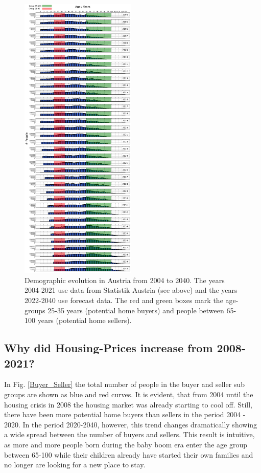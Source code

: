 \documentclass[11pt, a4paper, twocolumn]{article}
\begin{document}
\begin{figure}[!ht]
\includegraphics[width=0.49\textwidth]{../Figures/Demog_Forecast.png}
\caption{\small Demographic evolution in Austria from 2004 to 2040. The years 2004-2021 use data from Statistik Austria (see above) and the years 2022-2040 use forecast data. The red and green boxes mark the age-groups 25-35 years (potential home buyers) and people between 65-100 years (potential home sellers). \label{Demog_Forecast}}
\end{figure}

\subsection*{Why did Housing-Prices increase from 2008-2021?}

In Fig. \ref{Buyer_Seller} the total number of people in the buyer and seller sub groups are shown as blue and red curves. It is evident, that from 2004 until the housing crisis in 2008 the housing market was already starting to cool off. Still, there have been more potential home buyers than sellers in the period 2004 - 2020. In the period 2020-2040, however, this trend changes dramatically showing a wide spread between the number of buyers and sellers. This result is intuitive, as more and more people born during the baby boom era enter the age group between 65-100 while their children already have started their own families and no longer are looking for a new place to stay.
\end{document}
